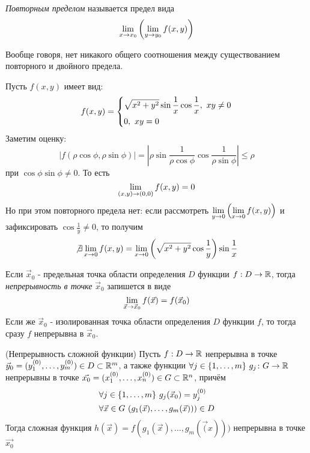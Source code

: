 \begin{definition}
	\textit{Повторным пределом} называется предел вида
	\[
		\lim\limits_{x \to x_0} \left(\lim\limits_{y \to y_0} f(x, y)\right)
	\]
\end{definition}

\begin{note}
	Вообще говоря, нет никакого общего соотношения между существованием повторного и двойного предела.
\end{note}

\begin{example}
	Пусть $f(x, y)$ имеет вид:
	\[
		f(x, y) = \System{
			&{\sqrt{x^2 + y^2} \sin \frac{1}{x} \cos \frac{1}{x}},\ xy \neq 0
			\\
			&{0,\ xy = 0}
		}
	\]
	Заметим оценку:
	\[
		|f(\rho\cos\phi, \rho\sin\phi)| =  \left|\rho\sin\frac{1}{\rho\cos\phi}\cos\frac{1}{\rho\sin\phi}\right| \le \rho
	\]
	при $\cos\phi\sin\phi \neq 0$. То есть
	\[
		\lim\limits_{(x, y) \to (0, 0)} f(x, y) = 0
	\]
	Но при этом повторного предела нет: если рассмотреть $\lim\limits_{y \to 0} \left(\lim\limits_{x \to 0} f(x, y)\right)$ и зафиксировать $\cos \frac{1}{y} \neq 0$, то получим
	\[
		\not\exists \lim\limits_{x \to 0} f(x, y) = \lim\limits_{x \to 0} \left(\sqrt{x^2 + y^2} \cos\frac{1}{y}\right)\sin\frac{1}{x}
	\]
\end{example}

\begin{definition}
	Если $\vec{x}_0$ - предельная точка области определения $D$ функции $f: D \to \mathbb{R}$, тогда \textit{непрерывность в точке} $\vec{x}_0$ запишется в виде
	\[
		\lim\limits_{\vec{x} \to \vec{x}_0} f(\vec{x}) = f(\vec{x}_0)
	\]
	Если же $\vec{x}_0$ - изолированная точка области определения $D$ функции $f$, то тогда сразу $f$ непрерывна в $\vec{x}_0$.
\end{definition}

\begin{theorem} (Непрерывность сложной функции)
	Пусть $f: D \to \mathbb{R}$ непрерывна в точке $\vec{y}_0 = (y_1^{(0)}, \ldots, y_m^{(0)}) \in D \subset \mathbb{R}^m$, а также функции $\forall j \in \{1, \ldots, m\}\ g_j \colon G \to \mathbb{R}$ непрерывны в точке $\vec{x_0} = (x_1^{(0)}, \ldots, x_n^{(0)}) \in G \subset \mathbb{R}^n$, причём
	\begin{align*}
		&{\forall j \in \{1, \ldots, m\}\ g_j(\vec{x}_0) = y_j^{(0)}}
		\\
		&{\forall \vec{x} \in G\ (g_1(\vec{x}), \ldots, g_m(\vec{x}))) \in D}
	\end{align*}
	Тогда сложная функция $h(\vec{x}) = f(g_1(\vec{x}), \ldots, g_m(\vec(x)))$ непрерывна в точке $\vec{x_0}$
\end{theorem}


